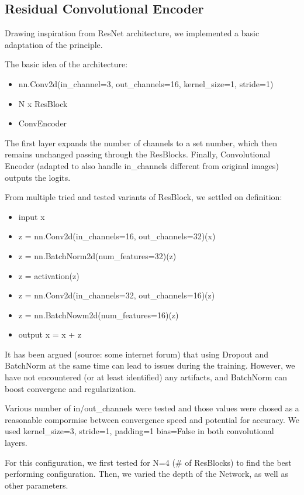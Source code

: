 \documentclass[12pt,a4paper]{article}
\begin{document}
\newpage

\subsection{Residual Convolutional Encoder}

Drawing inspiration from ResNet architecture, we implemented a
basic adaptation of the principle.

The basic idea of the architecture:
\begin{itemize}
  \item nn.Conv2d(in\_channel=3, out\_channels=16, kernel\_size=1, stride=1)
  \item N x ResBlock
  \item ConvEncoder
\end{itemize}

The first layer expands the number of channels to a set number,
which then remains unchanged passing through the ResBlocks. Finally,
Convolutional Encoder (adapted to also handle in\_channels different
from original images) outputs the logits.

From multiple tried and tested variants of ResBlock, we settled on definition:
\begin{itemize}
  \item input x
  \item z = nn.Conv2d(in\_channels=16, out\_channels=32)(x)
  \item z = nn.BatchNorm2d(num\_features=32)(z)
  \item z = activation(z)
  \item z = nn.Conv2d(in\_channels=32, out\_channels=16)(z)
  \item z = nn.BatchNowm2d(num\_features=16)(z)
  \item output x = x + z
\end{itemize}

It has been argued (source: some internet forum) that using Dropout and 
BatchNorm at the same time
can lead to issues during the training. However, we have not encountered
(or at least identified) any artifacts, and BatchNorm can boost
convergene and regularization.

Various number of in/out\_channels were tested and those values were
chosed as a reasonable compormise between convergence speed
and potential for accuracy.
We used kernel\_size=3, stride=1, padding=1 bias=False in both 
convolutional layers.

For this configuration, we first tested for N=4 (\# of ResBlocks)
to find the best performing configuration. Then, we varied the
depth of the Network, as well as other parameters.
\end{document}
